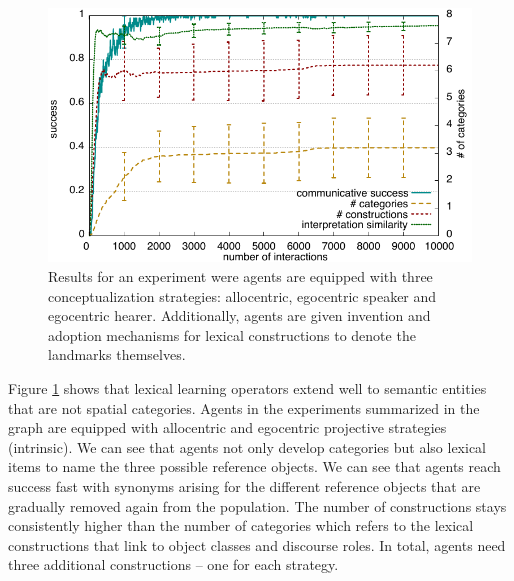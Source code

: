\begin{figure}
\includegraphics[width=1.0\columnwidth]{figs/chunk-alignment-formation-projective+marking-space-game-5}
\caption[Results strategy competition]{Results for an experiment were agents are equipped with three conceptualization
strategies: allocentric, egocentric speaker and egocentric hearer. Additionally, agents are given
invention and adoption mechanisms for lexical constructions to denote the landmarks themselves.}
\label{f:marker+category-formation}
\end{figure}

Figure \ref{f:marker+category-formation} shows that lexical learning operators 
extend well to semantic entities that are not 
spatial categories. Agents in the experiments summarized in the graph are 
equipped with 
allocentric and egocentric projective strategies (intrinsic). We can see that agents not only 
develop categories but also lexical items to name the three possible reference objects. 
We can see that agents reach success fast with synonyms arising for the different
reference objects that are gradually removed again from the population. The number of constructions
stays consistently higher than the number of categories which refers to the lexical constructions 
that link to object classes and discourse roles. In total, agents need three additional constructions -- one for each strategy.

